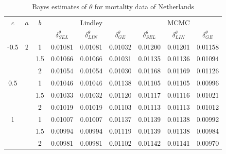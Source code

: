 \documentclass[11pt,a4paper]{article}
\numberwithin{equation}{section}
\begin{document}

	\begin{table}[htbp]

		\centering

		\caption{Bayes estimates of $\theta$ for mortality data of Netherlands}

		\begin{tabular}{c|c|c|ccc|ccc}

			\toprule

			\multirow{2}[3]{*}{$c$} & \multirow{2}[3]{*}{$a$} & \multirow{2}[3]{*}{$b$} & \multicolumn{3}{c|}{Lindley} & \multicolumn{3}{c}{MCMC} \\

			\cmidrule{4-9}          &       &       & $\delta^\theta_{SEL}$ & $\delta^\theta_{LIN}$ & \multicolumn{1}{c|}{$\delta^\theta_{GE}$} & $\delta^\theta_{SEL}$ & $\delta^\theta_{LIN}$ & $\delta^\theta_{GE}$ \\

			\midrule

			\multirow{3}[1]{*}{-0.5} & \multirow{12}[2]{*}{2} & 1     & 0.01081 & 0.01081 & 0.01032 & 0.01200 & 0.01201 & 0.01158 \\

			&       & 1.5   & 0.01066 & 0.01066 & 0.01031 & 0.01135 & 0.01136 & 0.01094 \\

			&       & 2     & 0.01054 & 0.01054 & 0.01030 & 0.01168 & 0.01169 & 0.01126 \\

			\multirow{3}[0]{*}{0.5} &       & 1     & 0.01046 & 0.01046 & 0.01138 & 0.01105 & 0.01105 & 0.00996 \\

			&       & 1.5   & 0.01033 & 0.01032 & 0.01120 & 0.01117 & 0.01116 & 0.01021 \\

			&       & 2     & 0.01019 & 0.01019 & 0.01103 & 0.01113 & 0.01113 & 0.01012 \\

			\multirow{3}[0]{*}{1} &       & 1     & 0.01007 & 0.01007 & 0.01137 & 0.01139 & 0.01138 & 0.00992 \\

			&       & 1.5   & 0.00994 & 0.00994 & 0.01119 & 0.01139 & 0.01138 & 0.00984 \\

			&       & 2     & 0.00981 & 0.00981 & 0.01102 & 0.01142 & 0.01141 & 0.00970 \\


\end{tabular}
\end{table}
\end{document}
